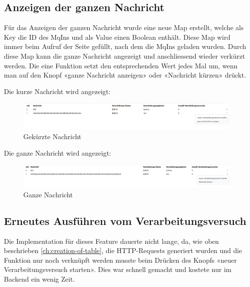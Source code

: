 \subsection{Anzeigen der ganzen Nachricht}
Für das Anzeigen der ganzen Nachricht wurde eine neue Map erstellt, welche als Key die ID des MqIns und als Value einen Boolean enthält. Diese Map wird immer beim Aufruf der Seite gefüllt, nach dem die MqIns geladen wurden. Durch diese Map kann die ganze Nachricht angezeigt und anschliessend wieder verkürzt werden. Die eine Funktion setzt den entsprechenden Wert jedes Mal um, wenn man auf den Knopf «ganze Nachricht anzeigen» oder «Nachricht kürzen» drückt.

\noindent Die kurze Nachricht wird angezeigt:
\begin{figure}[H]
	\begin{center}
		\includegraphics[width=1\textwidth]{ressourcen/Kurze-Nachricht}
		\caption[Gekürzte Nachricht]{Gekürzte Nachricht}\label{fig:show-shortend-version-of-message}
	\end{center}
\end{figure}

\noindent Die ganze Nachricht wird angezeigt:
\begin{figure}[H]
	\begin{center}
		\includegraphics[width=1\textwidth]{ressourcen/Ganze-Nachricht}
		\caption[Ganze Nachricht]{Ganze Nachricht}\label{fig:show-hole-message}
	\end{center}
\end{figure}

\subsection{Erneutes Ausführen vom Verarbeitungsversuch}
Die Implementation für dieses Feature dauerte nicht lange, da, wie oben beschrieben \ref{ch:creation-of-table}, die HTTP-Requests generiert wurden und die Funktion nur noch verknüpft werden musste beim Drücken des Knopfs «neuer Verarbeitungsversuch starten». Dies war schnell gemacht und kostete nur im Backend ein wenig Zeit.

